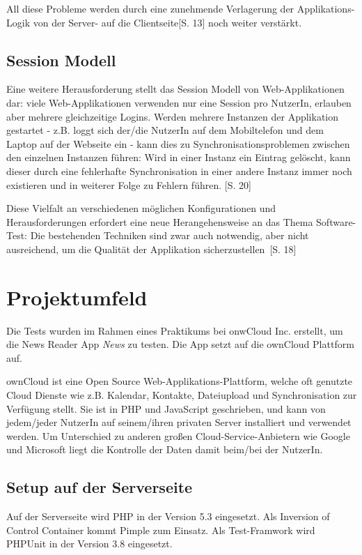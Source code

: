 \documentclass[a4paper,bibtotoc,oneside]{scrbook}
\begin{document}
All diese Probleme werden durch eine zunehmende Verlagerung der Applikations-Logik von der Server- auf die Clientseite\cite{testing_apps_on_web}[S. 13] noch weiter verstärkt. 

\section{Session Modell}
Eine weitere Herausforderung stellt das Session Modell von Web-Applikationen dar: viele Web-Applikationen verwenden nur eine Session pro NutzerIn, erlauben aber mehrere gleichzeitige Logins. Werden mehrere Instanzen der Applikation gestartet - z.B. loggt sich der/die NutzerIn auf dem Mobiltelefon und dem Laptop auf der Webseite ein - kann dies zu Synchronisationsproblemen zwischen den einzelnen Instanzen führen: Wird in einer Instanz ein Eintrag gelöscht, kann dieser durch eine fehlerhafte Synchronisation in einer andere Instanz immer noch existieren und in weiterer Folge zu Fehlern führen. \cite{testing_apps_on_web}[S. 20]


Diese Vielfalt an verschiedenen möglichen Konfigurationen und Herausforderungen erfordert eine neue Herangehensweise an das Thema Software-Test: Die bestehenden Techniken sind \glqq zwar auch notwendig, aber nicht ausreichend, um die Qualität der Applikation sicherzustellen\grqq\ \cite{eval_automat_webapp_test}[S. 18]


\chapter{Projektumfeld}
Die Tests wurden im Rahmen eines Praktikums bei onwCloud Inc. erstellt, um die News Reader App \emph{News} zu testen. Die App setzt auf die ownCloud\cite{owncloud} Plattform auf.

ownCloud ist eine Open Source Web-Applikations-Plattform, welche oft genutzte Cloud Dienste wie z.B. Kalendar, Kontakte, Dateiupload und Synchronisation zur Verfügung stellt. Sie ist in PHP und JavaScript geschrieben, und kann von jedem/jeder NutzerIn auf seinem/ihren privaten Server installiert und verwendet werden. Um Unterschied zu anderen großen Cloud-Service-Anbietern wie Google und Microsoft liegt die Kontrolle der Daten damit beim/bei der NutzerIn. 

\section{Setup auf der Serverseite}
Auf der Serverseite wird PHP in der Version 5.3 eingesetzt. Als Inversion of Control Container kommt Pimple\cite{pimple} zum Einsatz. Als Test-Framwork wird PHPUnit\cite{phpunit} in der Version 3.8 eingesetzt.
\end{document}
